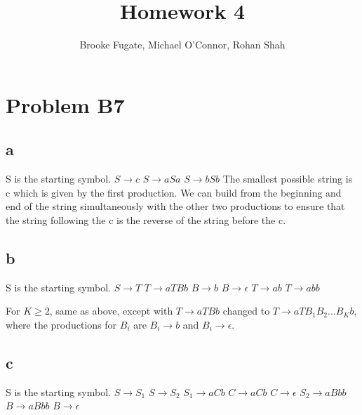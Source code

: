 \documentclass[12pt]{article}
\begin{document}
\pagestyle{plain}
\titleformat{\subsection}[runin]
  {\normalfont\large\bfseries}{\thesubsection}{1em}{}

\title{Homework 4}
\author{Brooke Fugate, Michael O'Connor, Rohan Shah}
\date{}

\maketitle

\section*{Problem B7}
\subsection*{a} S is the starting symbol. \newline
$S \rightarrow c$ \newline
$S \rightarrow aSa$ \newline
$S \rightarrow bSb$ \newline
The smallest possible string is c which is given by the first production. We can build from the beginning and end of the string simultaneously with the other two productions to ensure that the string following the c is the reverse of the string before the c.
\subsection*{b} S is the starting symbol. \newline
$S \rightarrow T$ \newline
$T \rightarrow aTBb$ \newline
$B \rightarrow b$ \newline
$B \rightarrow \epsilon$ \newline
$T \rightarrow ab$ \newline
$T \rightarrow abb$ \newline

\medskip

For $K \ge 2$, same as above, except with $T \rightarrow aTBb$ changed to $T \rightarrow aTB_1B_2...B_Kb$, where the productions for $B_i$ are $B_i \rightarrow b$ and $B_i \rightarrow \epsilon$.
\subsection*{c} S is the starting symbol. \newline
$S \rightarrow S_1$ \newline
$S \rightarrow S_2$ \newline
$S_1 \rightarrow aCb$ \newline
$C \rightarrow aCb$ \newline
$C \rightarrow \epsilon $ \newline
$S_2 \rightarrow aBbb$ \newline
$B \rightarrow aBbb$ \newline
$B \rightarrow \epsilon $ \newline
\end{document}
